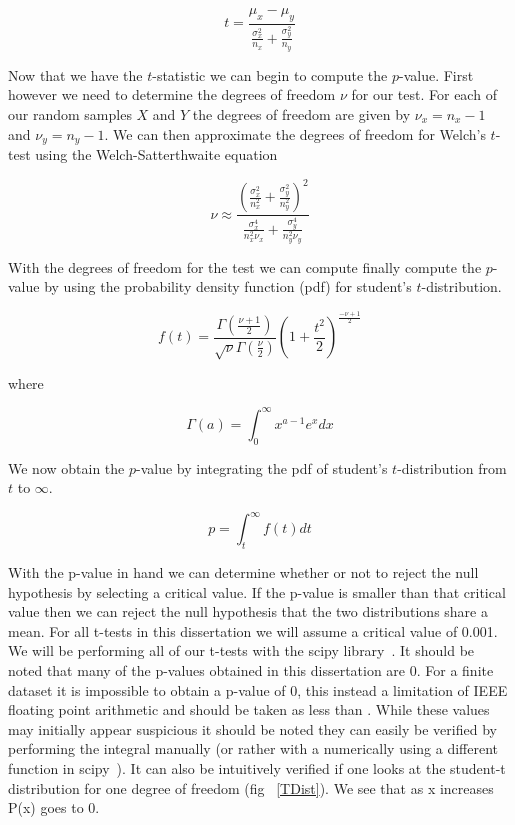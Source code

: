 	 \begin{equation}\label{t-stat}
		t = \frac{  \mu_x - \mu_y }{ \frac{\sigma_{x}^2}{n_x} + \frac{\sigma_{y}^2}{n_y}   }
	 \end{equation}

Now that we have the $t$-statistic we can begin to compute the $p$-value. First however we need to determine the degrees of freedom $\nu$ for our test. For each of our random samples $X$ and $Y$ the degrees of freedom are given by $\nu_x = n_x -1$ and $\nu_y = n_y-1$. We can then approximate the degrees of freedom for Welch's $t$-test using the Welch-Satterthwaite equation ~\cite{satterthwaite1946approximate,welch_generalization_1947}

	\begin{equation}\label{tTestDegrees}
		\nu \approx \frac{ (\frac{\sigma_{x}^2}{n_{x}^2}+\frac{\sigma_{y}^2}{n_{y}^2})^2 }{\frac{\sigma_{x}^4}{n_{x}^2 \nu_x}+\frac{\sigma_{y}^4}{n_{y}^2 \nu_y}}
	\end{equation}

With the degrees of freedom for the test we can compute finally compute the $p$-value by using the probability density function (pdf) for student's $t$-distribution. 

\begin{equation}\label{tTestPDF}
	f(t)=\frac{\Gamma(\frac{\nu+1}{2})}{\sqrt{\nu}\Gamma(\frac{\nu}{2})}(1+\frac{t^2}{2})^{\frac{-\nu+1}{2}}
\end{equation}

where 

\begin{equation}\label{Gamma}
	\Gamma(a) = \int_{0}^{\infty} x^{a-1}e^{x}dx
\end{equation}

We now obtain the $p$-value by integrating the pdf of student's $t$-distribution from $t$ to $\infty$. 

\begin{equation}\label{pvalStudentTest}
	p=\int_{t}^{\infty}f(t)dt 
\end{equation}

With the p-value in hand we can determine whether or not to reject the null hypothesis by selecting a critical value. If the p-value is smaller than that critical value then we can reject the null hypothesis that the two distributions share a mean.  For all t-tests in this dissertation we will assume a critical value of 0.001. We will be performing all of our t-tests with the scipy library~\cite{jones_scipy:_2001}. It should be noted that many of the p-values obtained in this dissertation are 0. For a finite dataset it is impossible to obtain a p-value of 0, this instead a limitation of IEEE floating point arithmetic and should be taken as less than  . While these values may initially appear suspicious it should be noted they can easily be verified by performing the integral manually (or rather with a numerically using a different function in scipy~\cite{jones_scipy:_2001}).  It can also be intuitively verified if one looks at the student-t distribution for one degree of freedom (fig ~\ref{TDist}).  We see that as x increases P(x) goes to 0.  

